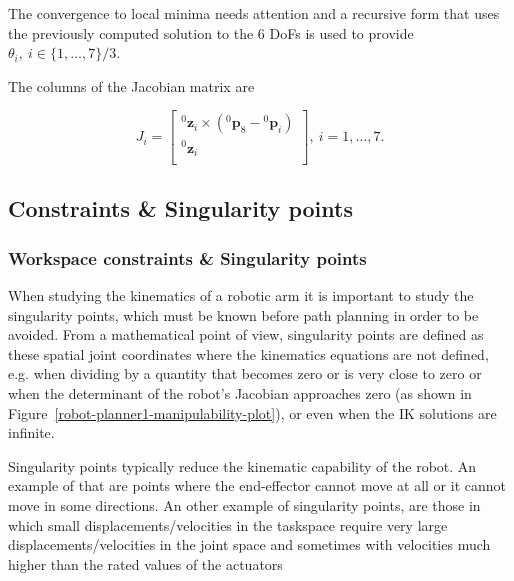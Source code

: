 The convergence to local minima needs attention and a recursive form that uses the previously computed solution to the 6 DoFs is used to provide $\theta_i,~i\in\{ 1,\ldots,7\}/3$.

The columns of the Jacobian matrix are 

\begin{equation}
J_i = \begin{bmatrix}
{}^0\mathbf{z}_i \times ({}^0\mathbf{p}_8 - {}^0\mathbf{p}_i) \\
{}^0\mathbf{z}_i \\
\end{bmatrix},~i=1,\ldots,7.
\end{equation}


\subsection{Constraints \& Singularity points}
%
\subsubsection{Workspace constraints \& Singularity points}
%
When studying the kinematics of a robotic arm it is important to study the singularity points, which must be known before path planning in order to be avoided. From a mathematical point of view, singularity points are defined as these spatial joint coordinates where the kinematics equations are not defined, e.g. when dividing by a quantity that becomes zero or is very close to zero or when the determinant of the robot's Jacobian approaches zero (as shown in Figure~\ref{robot-planner1-manipulability-plot}), or even when the IK solutions are infinite. 

Singularity points typically reduce the kinematic capability of the robot. An example of that are points where the end-effector cannot move at all or it cannot move in some directions. An other example of singularity points, are those in which small displacements/velocities in the taskspace require very large displacements/velocities in the joint space and sometimes with velocities much higher than the rated values of the actuators

